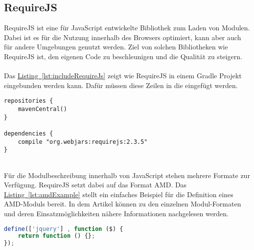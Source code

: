 \subsection{RequireJS}\label{sec:requireJs}
RequireJS \cite{requirejs} ist eine für JavaScript entwickelte Bibliothek zum Laden von Modulen. Dabei ist es für die Nutzung innerhalb des Browsers optimiert, kann aber auch für andere Umgebungen genutzt werden. Ziel von solchen Bibliotheken wie RequireJS ist, den eigenen Code zu beschleunigen und die Qualität zu steigern.\\
\\
Das \hyperref[lst:includeRequireJs]{Listing~\ref{lst:includeRequireJs}} zeigt wie RequireJS in einem Gradle Projekt eingebunden werden kann. Dafür müssen diese Zeilen in die  eingefügt werden.\\
\begin{lstlisting}[style=lstStyleFramed, language=Gradle, caption={Einbindung der Bibliothek RequireJs mittels Gradle}, label=lst:includeRequireJs, float]
repositories {
	mavenCentral()
}

dependencies {
	compile "org.webjars:requirejs:2.3.5"
}
\end{lstlisting}
\\
Für die Modulbeschreibung innerhalb von JavaScript stehen mehrere Formate zur Verfügung. RequireJS setzt dabei auf das Format \gls{AMD}. Das \hyperref[lst:amdExample]{Listing~\ref{lst:amdExample}} stellt ein einfaches Beispiel für die Definition eines \gls{AMD}-Moduls bereit. In dem Artikel \cite{jsModuleDefinitions} können zu den einzelnen Modul-Formaten und deren Einsatzmöglichkeiten nähere Informationen nachgelesen werden.
\\
\begin{lstlisting}[style=lstStyleFramed, language=JavaScript, caption={Beispiel: Moduldefinition mittels AMD \cite{requirejsExample}}, label=lst:amdExample, float]
define(['jquery'] , function ($) {
	return function () {};
});
\end{lstlisting}

